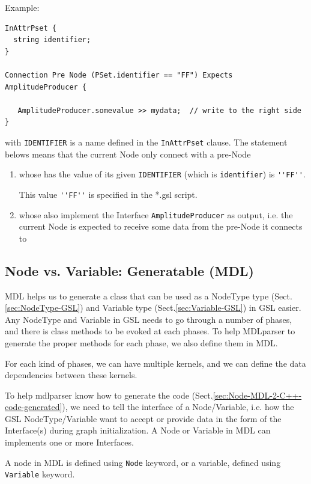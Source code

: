 Example:
\begin{verbatim}
InAttrPset {
  string identifier;
}

Connection Pre Node (PSet.identifier == "FF") Expects AmplitudeProducer {
   
   AmplitudeProducer.somevalue >> mydata;  // write to the right side
}
\end{verbatim}
with \verb!IDENTIFIER! is a name defined in the \verb!InAttrPset! clause.
The statement belows means that the current Node only connect with a pre-Node 
\begin{enumerate}
  \item  whose has the value of its given \verb!IDENTIFIER! (which is
  \verb!identifier!) is \verb!''FF''!.
  
  This value \verb!''FF''! is specified in the *.gsl script.
  
   \item whose also implement the Interface \verb!AmplitudeProducer! as output,
   i.e. the current Node is expected to receive some data from the pre-Node it
   connects to
\end{enumerate}


\subsection{Node vs. Variable: Generatable (MDL)}
\label{sec:Node-MDL}
\label{sec:Variable-MDL}

MDL helps us to generate a class that can be used as a NodeType type
(Sect.\ref{sec:NodeType-GSL}) and Variable type (Sect.\ref{sec:Variable-GSL}) in
GSL easier. Any NodeType and Variable in GSL needs to go through a number of
phases, and there is class methods to be evoked at each phases. To help
MDLparser to generate the proper methods for each phase, we also define them in
MDL.

For each kind of phases, we can have multiple kernels, and we can define the
data dependencies between these kernels.

To help mdlparser know how to generate the code
(Sect.\ref{sec:Node-MDL-2-C++-code-generated}), we need to tell the interface of
a Node/Variable, i.e. how the GSL NodeType/Variable want to accept or provide
data in the form of the Interface(s) during graph initialization.
A Node or Variable in MDL can implements one or more Interfaces.

A node in MDL is defined using \verb!Node! keyword, or a variable, defined using
\verb!Variable! keyword.

